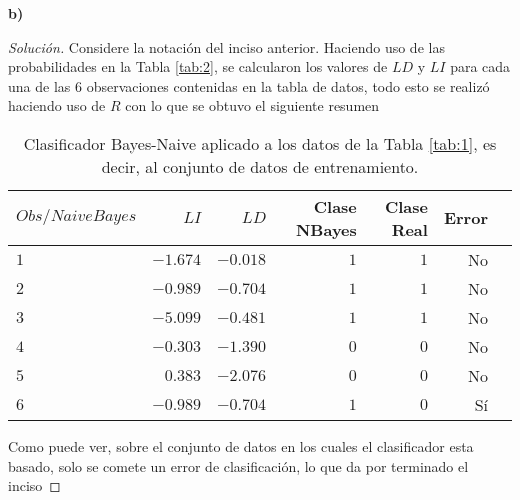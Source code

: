 \documentclass[10.5pt,notitlepage]{article}
\newenvironment{solucion}
  {\begin{proof}[Solución]}
  {\end{proof}}
\theoremstyle{plain}
\begin{document}
\textbf{b)}
\begin{solucion}
Considere la notación del inciso anterior. Haciendo uso de las probabilidades en la Tabla \ref{tab:2}, se calcularon los valores de \(LD\) y \(LI\) para cada una de las \(6\) observaciones contenidas en la tabla de datos, todo esto se realizó haciendo uso de \(R\) con lo que se obtuvo el siguiente resumen 
\begin{table}[H]
        \centering
        \begin{tabular}{@{}l@{\hskip 0.3in}|r@{\hskip 0.3in}r@{\hskip 0.3in}r@{\hskip 0.3in}r@{\hskip 0.3in}r@{\hskip 0.3in}r@{}}
            \toprule
            \(Obs/NaiveBayes\) & \(LI\) & \(LD\)& Clase NBayes& Clase Real& Error\\ 
            \midrule
            \(1\) &\(-1.674\) & \(-0.018\)& \(1\)&\(1\)&No\\
            \(2\) &\(-0.989\)&\(-0.704\)&\(1\)&\(1\)&No\\
            \(3\) &\(-5.099\) & \(-0.481\)& \(1\)&\(1\)&No \\
            \(4\) &\( -0.303\)&\(-1.390\)&\(0\)&\(0\)&No\\
            \(5\) &\(0.383\) & \( -2.076\)& \(0\)&\(0\)& No\\
            \(6\) &\(-0.989 \)&\(-0.704\)&\(1\)&\(0\)&Sí\\
            \bottomrule
        \end{tabular}
        \caption{Clasificador Bayes-Naive aplicado a los datos de la Tabla \ref{tab:1}, es decir, al conjunto de datos de entrenamiento.}
        \label{tab:3}
\end{table}
Como puede ver, sobre el conjunto de datos en los cuales el clasificador esta basado, solo se comete un error de clasificación, lo que da por terminado el inciso 
\end{solucion}
 
\end{document}
